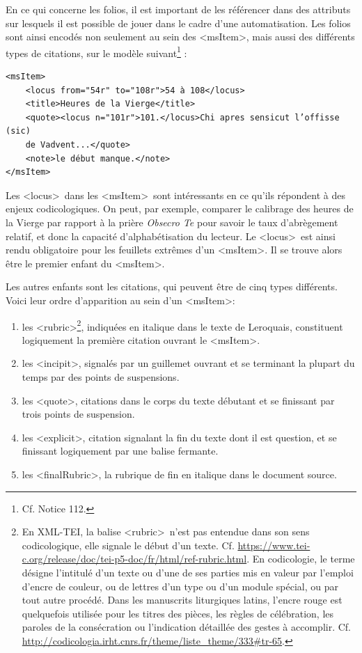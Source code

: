 \documentclass[a4paper,12pt,twoside]{book}
\begin{document}
En ce qui concerne les folios, il est important de les référencer dans des attributs sur lesquels il est possible de jouer dans le cadre d'une automatisation. Les folios sont ainsi encodés non seulement au sein des \textless msItem\textgreater, mais aussi des différents types de citations, sur le modèle suivant\footnote{Cf. Notice 112.} :
\begin{verbatim}
<msItem>
    <locus from="54r" to="108r">54 à 108</locus>
    <title>Heures de la Vierge</title>
    <quote><locus n="101r">101.</locus>Chi apres sensicut l’offisse (sic) 
    de Vadvent...</quote>
    <note>le début manque.</note>
</msItem>
\end{verbatim}
Les \textless locus\textgreater~dans les \textless msItem\textgreater~sont intéressants en ce qu’ils répondent à des enjeux codicologiques. On peut, par exemple, comparer le calibrage des heures de la Vierge par rapport à la prière \textit{Obsecro Te} pour savoir le taux d’abrègement relatif, et donc la capacité d’alphabétisation du lecteur. Le \textless locus\textgreater~est ainsi rendu obligatoire pour les feuillets extrêmes d’un \textless msItem\textgreater. Il se trouve alors être le premier enfant du \textless msItem\textgreater .

Les autres enfants sont les citations, qui peuvent être de cinq types différents. Voici leur ordre d'apparition au sein d'un \textless msItem\textgreater : 
\begin{enumerate}
    \item les \textless rubric\textgreater \footnote{En XML-TEI, la balise \textless rubric\textgreater~n'est pas entendue dans son sens codicologique, elle signale le début d'un texte. Cf. \url{https://www.tei-c.org/release/doc/tei-p5-doc/fr/html/ref-rubric.html}. En codicologie, le terme désigne l'intitulé d'un texte ou d'une de ses parties mis en valeur par l'emploi d'encre de couleur, ou de lettres d'un type ou d'un module spécial, ou par tout autre procédé. Dans les manuscrits liturgiques latins, l’encre rouge est quelquefois utilisée pour les titres des pièces, les règles de célébration, les paroles de la consécration ou l’indication détaillée des gestes à accomplir. Cf. \url{http://codicologia.irht.cnrs.fr/theme/liste_theme/333#tr-65}.}, indiquées en italique dans le texte de Leroquais, constituent logiquement la première citation ouvrant le \textless msItem\textgreater .
    \item les \textless incipit\textgreater, signalés par un guillemet ouvrant et se terminant la plupart du temps par des points de suspensions.
    \item les \textless quote\textgreater, citations dans le corps du texte débutant et se finissant par trois points de suspension.
    \item les \textless explicit\textgreater, citation signalant la fin du texte dont il est question, et se finissant logiquement par une balise fermante.
    \item les \textless finalRubric\textgreater, la rubrique de fin en italique dans le document source.
\end{enumerate}
\end{document}
